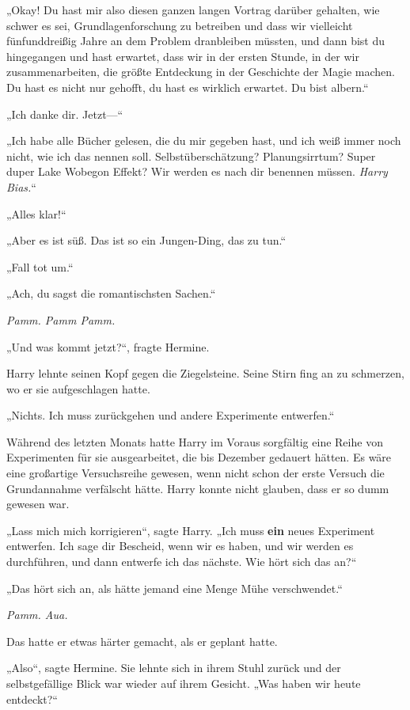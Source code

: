 {„Okay! Du hast mir also diesen ganzen langen Vortrag darüber gehalten, wie schwer es sei, Grundlagenforschung zu betreiben und dass wir vielleicht fünfunddreißig Jahre an dem Problem dranbleiben müssten, und dann bist du hingegangen und hast erwartet, dass wir in der ersten Stunde, in der wir zusammenarbeiten, die größte Entdeckung in der Geschichte der Magie machen. Du hast es nicht nur gehofft, du hast es wirklich erwartet. Du bist albern.“

„Ich danke dir. Jetzt—“

„Ich habe alle Bücher gelesen, die du mir gegeben hast, und ich weiß immer noch nicht, wie ich das nennen soll. Selbstüberschätzung? Planungsirrtum? Super duper Lake Wobegon Effekt? Wir werden es nach dir benennen müssen. \emph{Harry Bias.}“

„Alles klar!“

„Aber es ist süß. Das ist so ein Jungen-Ding, das zu tun.“

„Fall tot um.“

„Ach, du sagst die romantischsten Sachen.“

\emph{Pamm. Pamm Pamm.}

„Und was kommt jetzt?“, fragte Hermine.

Harry lehnte seinen Kopf gegen die Ziegelsteine. Seine Stirn fing an zu schmerzen, wo er sie aufgeschlagen hatte.

„Nichts. Ich muss zurückgehen und andere Experimente entwerfen.“

Während des letzten Monats hatte Harry im Voraus sorgfältig eine Reihe von Experimenten für sie ausgearbeitet, die bis Dezember gedauert hätten. Es wäre eine großartige Versuchsreihe gewesen, wenn nicht schon der erste Versuch die Grundannahme verfälscht hätte. Harry konnte nicht glauben, dass er so dumm gewesen war.

„Lass mich mich korrigieren“, sagte Harry. „Ich muss \textbf{ein} neues Experiment entwerfen. Ich sage dir Bescheid, wenn wir es haben, und wir werden es durchführen, und dann entwerfe ich das nächste. Wie hört sich das an?“

„Das hört sich an, als hätte jemand eine Menge Mühe verschwendet.“

\emph{Pamm. Aua.}

Das hatte er etwas härter gemacht, als er geplant hatte.

„Also“, sagte Hermine. Sie lehnte sich in ihrem Stuhl zurück und der selbstgefällige Blick war wieder auf ihrem Gesicht. „Was haben wir heute entdeckt?“

}
